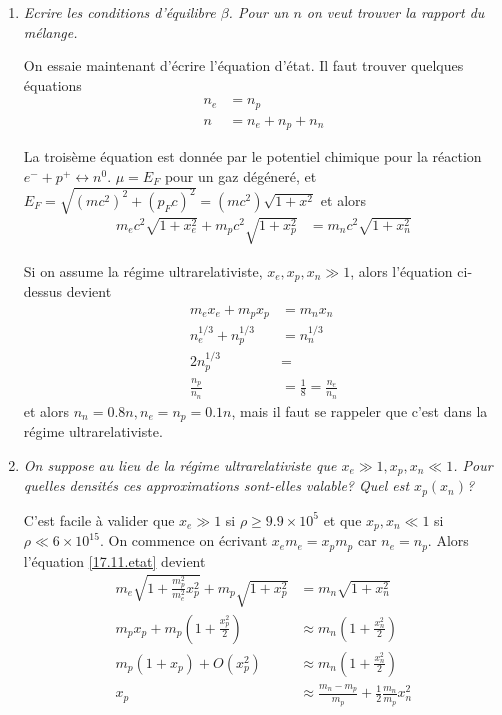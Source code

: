 \documentclass[10pt]{report}
\newcommand{\scinot}[2]{#1\times 10^{#2}}
\begin{document}
\begin{enumerate}[1.]
    \item \emph{Ecrire les conditions d'\'equilibre $\beta$. Pour un $n$ on veut trouver la rapport du m\'elange.}

        On essaie maintenant d'\'ecrire l'\'equation d'\'etat. Il faut trouver quelques \'equations
        \begin{align}
            n_e &= n_p\\
            n &= n_e + n_p + n_n
        \end{align}

        La trois\`eme \'equation est donn\'ee par le potentiel chimique pour la r\'eaction $e^- + p^+ \leftrightarrow n^0$. $\mu = E_F$ pour un gaz d\'eg\'ener\'e, et $E_F = \sqrt{(mc^2)^2 + (p_Fc)^2} = (mc^2)\sqrt{1+x^2}$ et alors
        \begin{align}
            m_ec^2\sqrt{1 + x_e^2} + m_pc^2\sqrt{1 + x_p^2} &= m_nc^2\sqrt{1 + x_n^2}\label{17.11.etat}
        \end{align}

        Si on assume la r\'egime ultrarelativiste, $x_e, x_p, x_n \gg 1$, alors l'\'equation ci-dessus devient
        \begin{align}
            m_ex_e + m_px_p &= m_nx_n\\
            n_e^{1/3} + n_p^{1/3} &= n_n^{1/3}\\
            2n_p^{1/3} &= \\
            \frac{n_p}{n_n} &= \frac{1}{8} = \frac{n_e}{n_n}
        \end{align}
        et alors $n_n = 0.8n, n_e = n_p = 0.1n$, mais il faut se rappeler que c'est dans la r\'egime ultrarelativiste.

    \item \emph{On suppose au lieu de la r\'egime ultrarelativiste que $x_e \gg 1, x_p, x_n \ll 1$. Pour quelles densit\'es ces approximations sont-elles valable? Quel est $x_p(x_n)$?}

        C'est facile \`a valider que $x_e \gg 1$ si $\rho \geq \scinot{9.9}{5}$ et que $x_p, x_n \ll 1$ si $\rho \ll \scinot{6}{15}$. On commence on \'ecrivant $x_em_e = x_pm_p$ car $n_e = n_p$. Alors l'\'equation \eqref{17.11.etat} devient
        \begin{align}
            m_e\sqrt{1 + \frac{m_p^2}{m_e^2}x_p^2} + m_p\sqrt{1 + x_p^2} &= m_n\sqrt{1 + x_n^2}\\
            m_px_p + m_p\left( 1 + \frac{x_p^2}{2} \right) &\approx m_n\left( 1 + \frac{x_n^2}{2} \right)\\
            m_p\left( 1 + x_p \right) + O(x_p^2) &\approx m_n\left( 1 + \frac{x_n^2}{2} \right)\\
            x_p &\approx \frac{m_n - m_p}{m_p} + \frac{1}{2}\frac{m_n}{m_p}x_n^2
        \end{align}


\end{enumerate}
\end{document}
